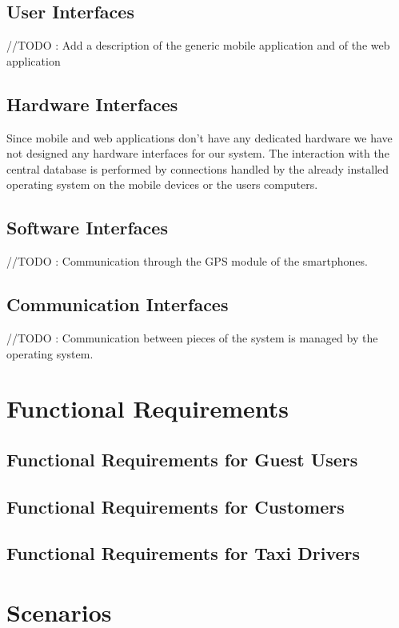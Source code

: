 \documentclass{report}
\begin{document}
		\subsection{User Interfaces}
		//TODO : Add a description of the generic mobile application and of the web application

		\subsection{Hardware Interfaces}
		Since mobile and web applications don't have any dedicated hardware we have not designed any hardware interfaces for our system.
		The interaction with the central database is performed by connections handled by the already installed operating system on the mobile devices or the users computers.

		\subsection{Software Interfaces}
		//TODO : Communication through the GPS module of the smartphones.

		\subsection{Communication Interfaces}
		//TODO : Communication between pieces of the system is managed by the operating system.

	\section{Functional Requirements}

		\subsection{Functional Requirements for Guest Users}

		\subsection{Functional Requirements for Customers}

		\subsection{Functional Requirements for Taxi Drivers}


	\section{Scenarios}
\end{document}
